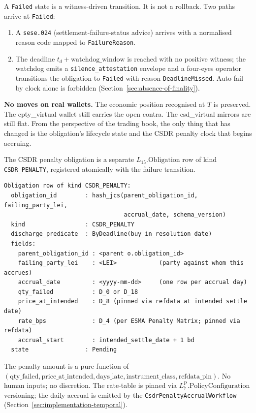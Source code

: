 \documentclass[11pt,a4paper]{article}
\begin{document}
A \texttt{Failed} state is a witness-driven transition. It is not a rollback. Two paths arrive at \texttt{Failed}:
\begin{enumerate}[nosep]
\item A \texttt{sese.024} (settlement-failure-status advice) arrives with a normalised reason code mapped to \texttt{FailureReason}.
\item The deadline $t_d + \mathrm{watchdog\_window}$ is reached with no positive witness; the watchdog emits a \texttt{silence\_attestation} envelope and a four-eyes operator transitions the obligation to \texttt{Failed} with reason \texttt{DeadlineMissed}. Auto-fail by clock alone is forbidden (Section~\ref{sec:absence-of-finality}).
\end{enumerate}

\textbf{No moves on real wallets.} The economic position recognised at $T$ is preserved. The cpty\_virtual wallet still carries the open contra. The csd\_virtual mirrors are still flat. From the perspective of the trading book, the only thing that has changed is the obligation's lifecycle state and the CSDR penalty clock that begins accruing.

The CSDR penalty obligation is a separate $L_{15}.\mathrm{Obligation}$ row of kind \texttt{CSDR\_PENALTY}, registered atomically with the failure transition.

\begin{lstlisting}
Obligation row of kind CSDR_PENALTY:
  obligation_id        : hash_jcs(parent_obligation_id, failing_party_lei,
                                  accrual_date, schema_version)
  kind                 : CSDR_PENALTY
  discharge_predicate  : ByDeadline(buy_in_resolution_date)
  fields:
    parent_obligation_id : <parent o.obligation_id>
    failing_party_lei    : <LEI>            (party against whom this accrues)
    accrual_date         : <yyyy-mm-dd>     (one row per accrual day)
    qty_failed           : D_0 or D_18
    price_at_intended    : D_8 (pinned via refdata at intended settle date)
    rate_bps             : D_4 (per ESMA Penalty Matrix; pinned via refdata)
    accrual_start        : intended_settle_date + 1 bd
  state                : Pending
\end{lstlisting}

The penalty amount is a pure function of $(\mathrm{qty\_failed}, \mathrm{price\_at\_intended}, \mathrm{days\_late}, \mathrm{instrument\_class}, \mathrm{refdata\_pin})$. No human inputs; no discretion. The rate-table is pinned via $L_7^{\mathrm{P}}.\mathrm{PolicyConfiguration}$ versioning; the daily accrual is emitted by the \texttt{CsdrPenaltyAccrualWorkflow} (Section~\ref{sec:implementation-temporal}).
\end{document}

